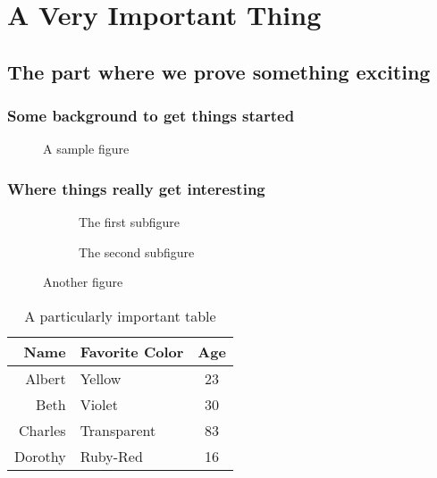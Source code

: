 \chapter{A Very Important Thing}

\blindtext

\section{The part where we prove something exciting}

\subsection{Some background to get things started}

\begin{figure}
	\centering
	\emptybox{4in}{2in}
	\caption{A sample figure}
\end{figure}

\blindtext

\blindtext

\subsection{Where things really get interesting}

\blindtext

\begin{figure}
	\centering
	\begin{subfigure}{.5\textwidth}
		\centering
		\emptybox{2in}{1in}
		\caption{The first subfigure}
	\end{subfigure}%
	\begin{subfigure}{.5\textwidth}
		\centering
		\emptybox{2in}{1in}
		\caption{The second subfigure}
	\end{subfigure}
	\caption{Another figure}
\end{figure}

\begin{table}
	\centering
	\begin{tabular}{r|lc}
		Name    & Favorite Color & Age \\ \hline
		Albert  & Yellow         & 23 \\
		Beth    & Violet         & 30 \\
		Charles & Transparent    & 83 \\
		Dorothy & Ruby-Red       & 16
	\end{tabular}
	\caption{A particularly important table} \label{table:PeopleOfInterest}
\end{table}

